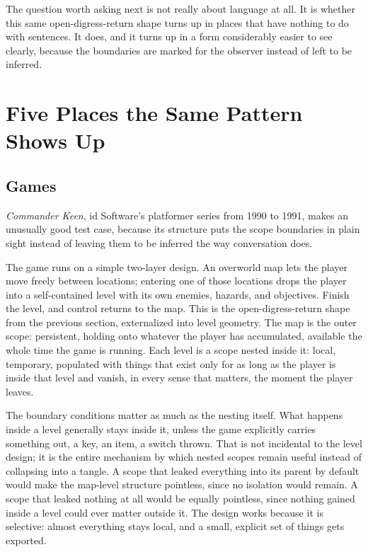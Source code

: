 \documentclass[11pt]{article}
\begin{document}
The question worth asking next is not really about language at all. It is whether this same open-digress-return shape turns up in places that have nothing to do with sentences. It does, and it turns up in a form considerably easier to see clearly, because the boundaries are marked for the observer instead of left to be inferred.

\section{Five Places the Same Pattern Shows Up}

\subsection{Games}

\emph{Commander Keen}, id Software's platformer series from 1990 to 1991, makes an unusually good test case, because its structure puts the scope boundaries in plain sight instead of leaving them to be inferred the way conversation does.

The game runs on a simple two-layer design. An overworld map lets the player move freely between locations; entering one of those locations drops the player into a self-contained level with its own enemies, hazards, and objectives. Finish the level, and control returns to the map. This is the open-digress-return shape from the previous section, externalized into level geometry. The map is the outer scope: persistent, holding onto whatever the player has accumulated, available the whole time the game is running. Each level is a scope nested inside it: local, temporary, populated with things that exist only for as long as the player is inside that level and vanish, in every sense that matters, the moment the player leaves.

The boundary conditions matter as much as the nesting itself. What happens inside a level generally stays inside it, unless the game explicitly carries something out, a key, an item, a switch thrown. That is not incidental to the level design; it is the entire mechanism by which nested scopes remain useful instead of collapsing into a tangle. A scope that leaked everything into its parent by default would make the map-level structure pointless, since no isolation would remain. A scope that leaked nothing at all would be equally pointless, since nothing gained inside a level could ever matter outside it. The design works because it is selective: almost everything stays local, and a small, explicit set of things gets exported.
\end{document}
